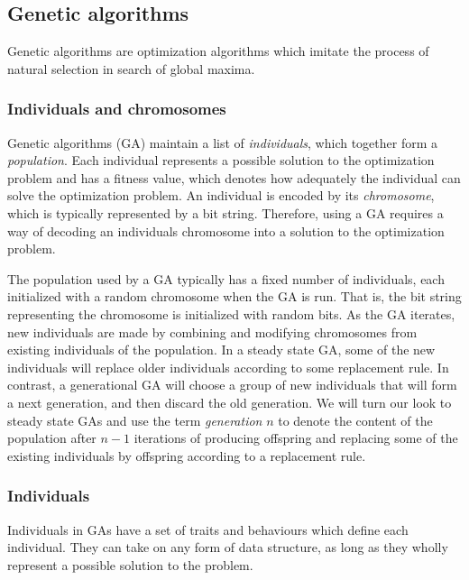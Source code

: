 \subsection{Genetic algorithms} 
Genetic algorithms are optimization algorithms which imitate the process of natural selection in search of global maxima.

\subsubsection{Individuals and chromosomes}
Genetic algorithms (GA) maintain a list of \emph{individuals}, which together form a \emph{population}. Each individual represents a possible solution to the optimization problem and has a fitness value, which denotes how adequately the individual can solve the optimization problem. An individual is encoded by its \emph{chromosome}, which is typically represented by a bit string. Therefore, using a GA requires a way of decoding an individuals chromosome into a solution to the optimization problem.

The population used by a GA typically has a fixed number of individuals, each initialized with a random chromosome when the GA is run. That is, the bit string representing the chromosome is initialized with random bits. As the GA iterates, new individuals are made by combining and modifying chromosomes from existing individuals of the population. 
In a steady state GA, some of the new individuals will replace older individuals according to some replacement rule. 
In contrast, a generational GA will choose a group of new individuals that will form a next generation, and then discard the old generation\cite{fogarty}. 
We will turn our look to steady state GAs and use the term \emph{generation} $n$ to denote the content of the population after
$n-1$ iterations of producing offspring and replacing some of the existing individuals by offspring according to a replacement rule.

\subsubsection{Individuals}
Individuals in GAs have a set of traits and behaviours which define each individual. They can take on any form of data structure, as long as they wholly represent a possible solution to the problem. 



